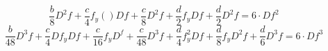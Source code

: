\documentclass[nochap]{apuntes}
\begin{document}
\[\frac{b}{8}D^2f +\frac{c}{4}f_y()Df+\frac{c}{8}D^2f + \frac{d}{2}f_yDf+\frac{d}{2}D^2f= 6\cdot Df^2 \]
\[\frac{b}{48}D^3f + \frac{c}{4}Df_yDf+\frac{c}{16}f_yD^f+\frac{c}{48}D^3f+\frac{d}{4}f^2_yDf+\frac{d}{8}f_yD^2f + \frac{d}{6}D^3f= 6\cdot Df^3\]

%
%
%
%
%
%
%
%
\end{document}
